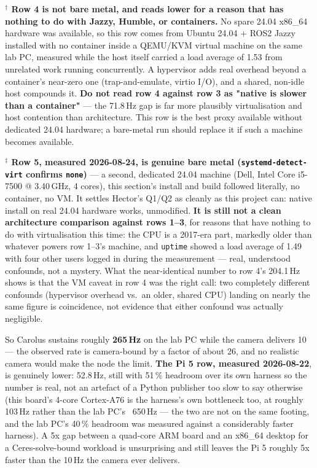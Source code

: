 \documentclass[11pt]{report}
\newenvironment{warningbox}%
  {\begin{lrbox}{\warnbox}\begin{minipage}{0.90\textwidth}}%
  {\end{minipage}\end{lrbox}%
   \begin{center}\fcolorbox{black}{codebg}{\usebox{\warnbox}}\end{center}}
\begin{document}
\begin{warningbox}
\textbf{$^\dagger$ Row 4 is not bare metal, and reads lower for a reason
that has nothing to do with Jazzy, Humble, or containers.} No spare 24.04
x86\_64 hardware was available, so this row comes from Ubuntu 24.04 +
ROS2 Jazzy installed with no container inside a QEMU/KVM virtual machine on
the same lab PC, measured while the host itself carried a load average of
1.53 from unrelated work running concurrently. A hypervisor adds real
overhead beyond a container's near-zero one (trap-and-emulate, virtio I/O),
and a shared, non-idle host compounds it. \textbf{Do not read row 4 against
row 3 as "native is slower than a container"} --- the 71.8\,Hz gap is far
more plausibly virtualisation and host contention than architecture. This
row is the best proxy available without dedicated 24.04 hardware; a
bare-metal run should replace it if such a machine becomes available.

\textbf{$^\ddagger$ Row 5, measured 2026-08-24, is genuine bare metal
(\texttt{systemd-detect-virt} confirms \texttt{none})} --- a second,
dedicated 24.04 machine (Dell, Intel Core i5-7500 @ 3.40\,GHz, 4 cores),
this section's install and build followed literally, no container, no VM.
It settles Hector's Q1/Q2 as cleanly as this project can: native install on
real 24.04 hardware works, unmodified. \textbf{It is still not a clean
architecture comparison against rows 1--3}, for reasons that have nothing
to do with virtualisation this time: the CPU is a 2017-era part, markedly
older than whatever powers row 1--3's machine, and \texttt{uptime} showed a
load average of 1.49 with four other users logged in during the
measurement --- real, understood confounds, not a mystery. What the
near-identical number to row 4's 204.1\,Hz shows is that the VM caveat in
row 4 was the right call: two completely different confounds (hypervisor
overhead vs.\ an older, shared CPU) landing on nearly the same figure is
coincidence, not evidence that either confound was actually negligible.
\end{warningbox}

So Carolus sustains roughly \textbf{265\,Hz} on the lab PC while the camera
delivers 10 --- the observed rate is camera-bound by a factor of about 26,
and no realistic camera would make the node the limit. \textbf{The Pi 5 row,
measured 2026-08-22}, is genuinely lower: 52.8\,Hz, still with 51\,\%
headroom over its own harness so the number is real, not an artefact of a
Python publisher too slow to say otherwise (this board's 4-core Cortex-A76 is
the harness's own bottleneck too, at roughly 103\,Hz rather than the lab PC's
~650\,Hz --- the two are not on the same footing, and the lab PC's 40\,\%
headroom was measured against a considerably faster harness). A 5x gap
between a quad-core ARM board and an x86\_64 desktop for a Ceres-solve-bound
workload is unsurprising and still leaves the Pi 5 roughly 5x faster than the
10\,Hz the camera ever delivers.
\end{document}
